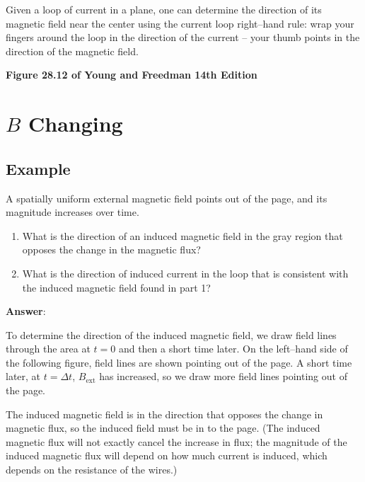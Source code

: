 \documentclass{article}
\begin{document}
Given a loop of current in a plane, one can determine the direction of its magnetic field near the center using the current loop right--hand rule: wrap your fingers around the loop in the direction of the current -- your thumb points in the direction of the magnetic field.



\textbf{Figure 28.12 of Young and Freedman 14th Edition}

\newpage

\section{$B$ Changing}

\subsection{Example}

A spatially uniform external magnetic field points out of the page, and its magnitude increases over time.



\begin{enumerate}

  \item What is the direction of an induced magnetic field in the gray region that opposes the change in the magnetic flux?

  \item What is the direction of induced current in the loop that is consistent with the induced magnetic field found in part 1?

\end{enumerate}

{\bf Answer}:

To determine the direction of the induced magnetic field, we draw field lines through the area at $t=0$ and then a short time later. On the left--hand side of the following figure, field lines are shown pointing out of the page. A short time later, at $t=\Delta t$, $B_{\text{ext}}$ has increased, so we draw more field lines pointing out of the page.

The induced magnetic field is in the direction that opposes the change in magnetic flux, so the induced field must be in to the page. (The induced magnetic flux will not exactly cancel the increase in flux; the magnitude of the induced magnetic flux will depend on how much current is induced, which depends on the resistance of the wires.)
\end{document}
